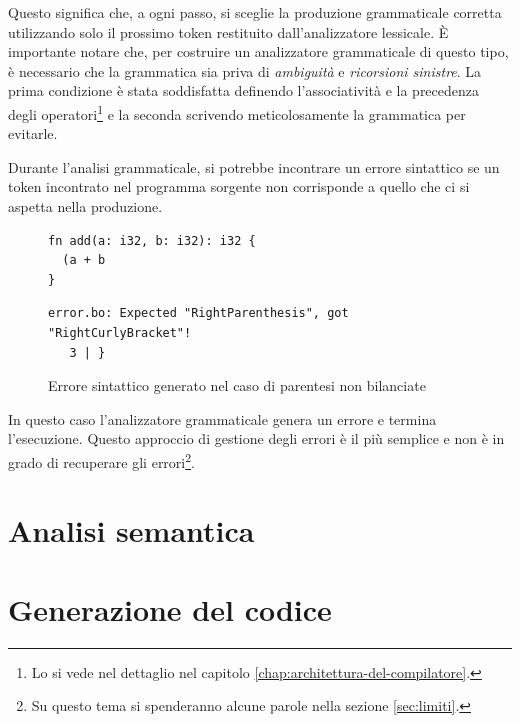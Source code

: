 Questo significa che, a ogni passo, si sceglie la produzione grammaticale corretta utilizzando solo il prossimo token restituito dall'analizzatore lessicale. \`E importante notare che, per costruire un analizzatore grammaticale di questo tipo, \`e necessario che la grammatica sia priva di \emph{ambiguit\`a} e \emph{ricorsioni sinistre}. La prima condizione \`e stata soddisfatta definendo l'associativit\`a e la precedenza degli operatori\footnote{Lo si vede nel dettaglio nel capitolo \ref{chap:architettura-del-compilatore}.} e la seconda scrivendo meticolosamente la grammatica per evitarle.

Durante l'analisi grammaticale, si potrebbe incontrare un errore sintattico se un token incontrato nel programma sorgente non corrisponde a quello che ci si aspetta nella produzione.
\begin{figure}[H]
	\centering
	\begin{verbatim}
fn add(a: i32, b: i32): i32 {
  (a + b
}
	\end{verbatim}
	\begin{verbatim}
error.bo: Expected "RightParenthesis", got "RightCurlyBracket"!
   3 | }
	\end{verbatim}
	\label{fig:bugginout-syntax-error}
	\caption{Errore sintattico generato nel caso di parentesi non bilanciate}
\end{figure}
In questo caso l'analizzatore grammaticale genera un errore e termina l'esecuzione. Questo approccio di gestione degli errori \`e il pi\`u semplice e non \`e in grado di recuperare gli errori\footnote{Su questo tema si spenderanno alcune parole nella sezione \ref{sec:limiti}.}.

\section{Analisi semantica}
\label{sec:analisi-semantica}

\section{Generazione del codice}
\label{sec:generazione-del-codice}

